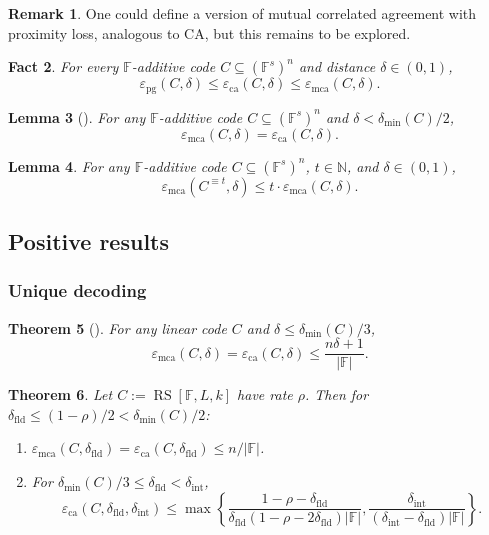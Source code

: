 \documentclass[11pt]{article}
\theoremstyle{plain}
\newtheorem{theorem}{Theorem}[section]
\newtheorem{lemma}[theorem]{Lemma}
\newtheorem{fact}[theorem]{Fact}
\theoremstyle{definition}
\newtheorem{remark}[theorem]{Remark}
\newcommand{\F}{\mathbb{F}}
\newcommand{\N}{\mathbb{N}}
\newcommand{\RS}[3]{\operatorname{RS}[#1,#2,#3]}
\newcommand{\epspg}{\varepsilon_{\mathrm{pg}}}
\newcommand{\epsca}{\varepsilon_{\mathrm{ca}}}
\newcommand{\epsmca}{\varepsilon_{\mathrm{mca}}}
\newcommand{\distmin}{\delta_{\min}}
\newcommand{\fld}{\mathrm{fld}}
\newcommand{\intr}{\mathrm{int}}
\newcommand{\abs}[1]{\left|#1\right|}
\begin{document}
\begin{remark}
One could define a version of mutual correlated agreement with proximity loss, analogous to CA, but this remains to be explored.
\end{remark}

\begin{fact}
For every $\F$-additive code $C\subseteq(\F^s)^n$ and distance $\delta\in(0,1)$,
\[
  \epspg(C,\delta)\le\epsca(C,\delta)\le\epsmca(C,\delta).
\]
\end{fact}

\begin{lemma}[\cite{ACFY25}]
For any $\F$-additive code $C\subseteq(\F^s)^n$ and $\delta<\distmin(C)/2$,
\[
  \epsmca(C,\delta)=\epsca(C,\delta).
\]
\end{lemma}

\begin{lemma}
For any $\F$-additive code $C\subseteq(\F^s)^n$, $t\in\N$, and $\delta\in(0,1)$,
\[
  \epsmca(C^{\equiv t},\delta)\le t\cdot\epsmca(C,\delta).
\]
\end{lemma}

\subsection{Positive results}

\subsubsection{Unique decoding}

\begin{theorem}[\cite{AHIV17}]
For any linear code $C$ and $\delta\le\distmin(C)/3$,
\[
  \epsmca(C,\delta)=\epsca(C,\delta)\le \frac{n\delta+1}{\abs{\F}}.
\]
\end{theorem}

\begin{theorem}
Let $C:=\RS{\F}{L}{k}$ have rate $\rho$. Then for $\delta_{\fld}\le(1-\rho)/2<\distmin(C)/2$:
\begin{enumerate}
  \item \cite{BCIKS20} $\epsmca(C,\delta_{\fld})=\epsca(C,\delta_{\fld})\le n/\abs{\F}$.
  \item \cite{BCHKS25} For $\distmin(C)/3\le\delta_{\fld}<\delta_{\intr}$,
\[
\epsca(C,\delta_{\fld},\delta_{\intr})\le
\max\left\{
\frac{1-\rho-\delta_{\fld}}{\delta_{\fld}(1-\rho-2\delta_{\fld})\abs{\F}},
\frac{\delta_{\intr}}{(\delta_{\intr}-\delta_{\fld})\abs{\F}}
\right\}.
\]
\end{enumerate}
\end{theorem}
\end{document}
